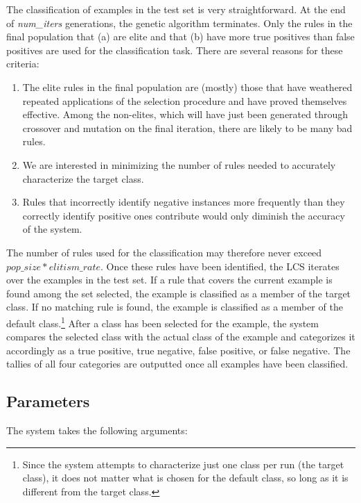 \documentclass[12pt]{article}
\begin{document}
The classification of examples in the test set is very straightforward. At the end of \textit{num\_iters} generations, the genetic algorithm terminates. Only the rules in the final population that (a) are elite and that (b) have more true positives than false positives are used for the classification task. There are several reasons for these criteria:
\begin{enumerate}
\item The elite rules in the final population are (mostly) those that have weathered repeated applications of the selection procedure and have proved themselves effective. Among the non-elites, which will have just been generated through crossover and mutation on the final iteration, there are likely to be many bad rules.
\item We are interested in minimizing the number of rules needed to accurately characterize the target class.
\item Rules that incorrectly identify negative instances more frequently than they correctly identify positive ones contribute would only diminish the accuracy of the system.
\end{enumerate}

The number of rules used for the classification may therefore never exceed $pop\_size * elitism\_rate$. Once these rules have been identified, the LCS iterates over the examples in the test set. If a rule that covers the current example is found among the set selected, the example is classified as a member of the target class. If no matching rule is found, the example is classified as a member of the default class.\footnote{Since the system attempts to characterize just one class per run (the target class), it does not matter what is chosen for the default class, so long as it is different from the target class.} After a class has been selected for the example, the system compares the selected class with the actual class of the example and categorizes it accordingly as a true positive, true negative, false positive, or false negative. The tallies of all four categories are outputted once all examples have been classified.

\subsection{Parameters}

The system takes the following arguments:
\end{document}
